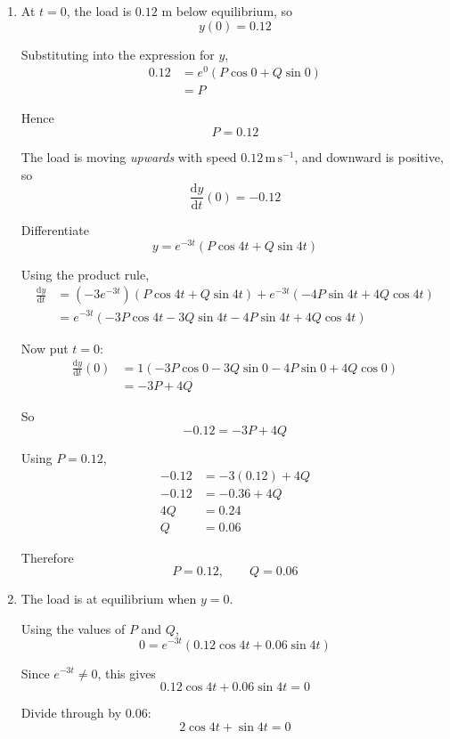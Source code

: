 \documentclass[leqno]{article}
\begin{document}
\begin{enumerate}[
  label=\textbf{\arabic*.},
  leftmargin=*,
  topsep=0pt,
  partopsep=0pt,
  parsep=0pt
]
\begin{tcolorbox}[colback=white, colframe=scarlet, title={\textbf{Solution}}, breakable, grow to left by=6mm, grow to right by=10mm]
\begin{enumerate}[label=\textbf{(\alph*)}]
  \begin{enumerate}[label=(\roman*)]
    \item At $t=0$, the load is $0.12$ m below equilibrium, so
    \[
    y(0)=0.12
    \]

    Substituting into the expression for $y$,
    \begin{align*}
    0.12
    &=e^0\left(P\cos 0+Q\sin 0\right) \\
    &=P
    \end{align*}

    Hence
    \[
    P=0.12
    \]

    The load is moving \emph{upwards} with speed $0.12\,\mathrm{m\,s^{-1}}$, and downward is positive, so
    \[
    \frac{\mathrm{d}y}{\mathrm{d}t}(0)=-0.12
    \]

    Differentiate
    \[
    y=e^{-3t}(P\cos 4t+Q\sin 4t)
    \]

    Using the product rule,
    \begin{align*}
    \frac{\mathrm{d}y}{\mathrm{d}t}
    &=(-3e^{-3t})(P\cos 4t+Q\sin 4t)+e^{-3t}(-4P\sin 4t+4Q\cos 4t) \\
    &=e^{-3t}\left(-3P\cos 4t-3Q\sin 4t-4P\sin 4t+4Q\cos 4t\right)
    \end{align*}

    Now put $t=0$:
    \begin{align*}
    \frac{\mathrm{d}y}{\mathrm{d}t}(0)
    &=1\left(-3P\cos 0-3Q\sin 0-4P\sin 0+4Q\cos 0\right) \\
    &=-3P+4Q
    \end{align*}

    So
    \[
    -0.12=-3P+4Q
    \]

    Using $P=0.12$,
    \begin{align*}
    -0.12&=-3(0.12)+4Q \\
    -0.12&=-0.36+4Q \\
    4Q&=0.24 \\
    Q&=0.06
    \end{align*}

    Therefore
    \[
    P=0.12,\qquad Q=0.06
    \]

    \item The load is at equilibrium when $y=0$.

    Using the values of $P$ and $Q$,
    \[
    0=e^{-3t}(0.12\cos 4t+0.06\sin 4t)
    \]

    Since $e^{-3t}\neq 0$, this gives
    \[
    0.12\cos 4t+0.06\sin 4t=0
    \]

    Divide through by $0.06$:
    \[
    2\cos 4t+\sin 4t=0
    \]


\end{enumerate}
\end{enumerate}
\end{tcolorbox}
\end{enumerate}
\end{document}

